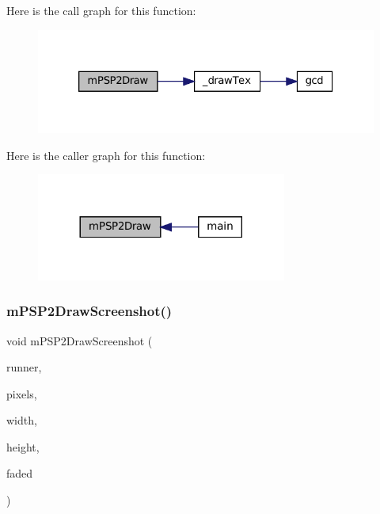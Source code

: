 Here is the call graph for this function\+:
\nopagebreak
\begin{figure}[H]
\begin{center}
\leavevmode
\includegraphics[width=326pt]{psp2-context_8h_ac47f4c33aec2cd84a2236b2686d1ffbe_cgraph}
\end{center}
\end{figure}
Here is the caller graph for this function\+:
\nopagebreak
\begin{figure}[H]
\begin{center}
\leavevmode
\includegraphics[width=233pt]{psp2-context_8h_ac47f4c33aec2cd84a2236b2686d1ffbe_icgraph}
\end{center}
\end{figure}
\mbox{\label{psp2-context_8h_a7d85f67c011584f65517082fd5e501bd}} 
\subsubsection{\texorpdfstring{m\+P\+S\+P2\+Draw\+Screenshot()}{mPSP2DrawScreenshot()}}
{\footnotesize\ttfamily void m\+P\+S\+P2\+Draw\+Screenshot (\begin{DoxyParamCaption}\item[{struct \mbox{\hyperlink{structm_g_u_i_runner}{m\+G\+U\+I\+Runner}} $\ast$}]{runner,  }\item[{const color\+\_\+t $\ast$}]{pixels,  }\item[{unsigned}]{width,  }\item[{unsigned}]{height,  }\item[{\mbox{\hyperlink{libretro_8h_a4a26dcae73fb7e1528214a068aca317e}{bool}}}]{faded }\end{DoxyParamCaption})}

